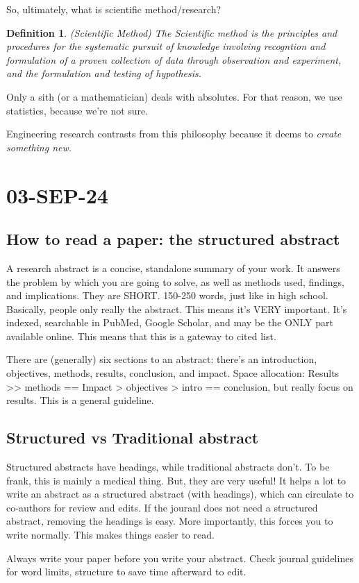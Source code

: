 \documentclass[10pt, oneside]{article}
\newtheorem{defn}{Definition}
\begin{document}
So, ultimately, what is scientific method/research?
\begin{defn}(Scientific Method)
    The Scientific method is the principles and procedures for the systematic pursuit of knowledge involving recogntion and formulation of a proven collection of data through observation and experiment, and the formulation and testing of hypothesis. 
\end{defn}
Only a sith (or a mathematician) deals with absolutes. For that reason, we use statistics, because we're not sure. 

Engineering research contrasts from this philosophy because it deems to \textit{create something new.}

\section{03-SEP-24}
\subsection{How to read a paper: the structured abstract}
A research abstract is a concise, standalone summary of your work. It answers the problem by which you are going to solve, as well as methods used, findings, and implications. They are SHORT. 150-250 words, just like in high school. 
Basically, people only really the abstract. This means it's VERY important. It's indexed, searchable in PubMed, Google Scholar, and may be the ONLY part available online. This means that this is a gateway to cited list. 

There are (generally) six sections to an abstract: there's an introduction, objectives, methods, results, conclusion, and impact. Space allocation: Results >> methods == Impact > objectives > intro == conclusion, but really focus on results. This is a general guideline. 
\subsection{Structured vs Traditional abstract}
Structured abstracts have headings, while traditional abstracts don't. To be frank, this is mainly a medical thing. But, they are very useful! It helps a lot to write an abstract as a structured abstract (with headings), which can circulate to co-authors for review and edits. If the jouranl does not need a structured abstract, removing the headings is easy. 
More importantly, this forces you to write normally. This makes things easier to read. 

Always write your paper before you write your abstract. Check journal guidelines for word limits, structure to save time afterward to edit. 
\end{document}
